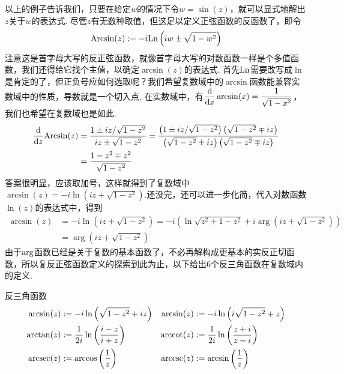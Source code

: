 以上的例子告诉我们，只要在给定\(w\)的情况下令\(w=\sin(z)\)，就可以显式地解出\(z\)关于\(w\)的表达式. 尽管\(z\)有无数种取值，但这足以定义正弦函数的反函数了，即令
\[{\rm Arcsin}(z):=-i{\rm Ln}\left(iw \pm \sqrt{1-w^2}\right)\]
注意这是首字母大写的反正弦函数，就像首字母大写的对数函数一样是个多值函数，我们还得给它找个主值，以确定\(\arcsin(z)\)的表达式. 首先\({\rm Ln}\)需要改写成\(\ln\)是肯定的了，但正负号应如何选取呢？我们希望复数域中的\(\arcsin\)函数能兼容实数域中的性质，导数就是一个切入点. 在实数域中，有\(\displaystyle{\frac{\rm d}{{\rm d}x}\arcsin(x) = \frac{1}{\sqrt{1-x^2}}}\)，我们也希望在复数域也是如此.
\begin{align*}
    \frac{\rm d}{{\rm d}z}{\rm Arcsin}(z) &= \frac{1 \pm iz/\sqrt{1-z^2}}{iz \pm \sqrt{1-z^2}} = \frac{\left(1\pm iz/\sqrt{1-z^2}\right)\left(\sqrt{1-z^2}\mp iz\right)}{\left(\sqrt{1-z^2}\pm iz\right)\left(\sqrt{1-z^2}\mp iz\right)} \\
    &= \frac{1-z^2 \mp z^2}{\sqrt{1-z^2}}
\end{align*}
答案很明显，应该取加号，这样就得到了复数域中\(\displaystyle{\arcsin(z)=-i\ln\left(iz+\sqrt{1-z^2}\right)}\).还没完，还可以进一步化简，代入对数函数\(\ln(z)\)的表达式中，得到
\begin{align*}
    \arcsin(z) & =-i\ln\left(iz+\sqrt{1-z^2}\right) = -i\left(\ln\sqrt{z^2+1-z^2}+i\arg\left(iz+\sqrt{1-z^2}\right)\right) \\
    &= \arg\left(iz+\sqrt{1-z^2}\right)
\end{align*}
由于\({\rm arg}\)函数已经是关于复数的基本函数了，不必再解构成更基本的实反正切函数，所以复反正弦函数定义的探索到此为止，以下给出6个反三角函数在复数域内的定义.
\begin{definition}{反三角函数}
    \[
        \begin{aligned}
            \arcsin(z) &:= -i\ln\left(\sqrt{1-z^2}+iz\right) & \arcsin(z) &:= -i\ln\left(i\sqrt{1-z^2}+z\right) \\
            \arctan(z) &:= \frac{1}{2i}\ln\left(\frac{i-z}{i+z}\right) & {\rm arccot}(z) &:= \frac{1}{2i}\ln\left(\frac{z+i}{z-i}\right) \\
            {\rm arcsec}(z) &:= \arccos\left(\frac{1}{z}\right) & {\rm arccsc}(z) &:= \arcsin\left(\frac{1}{z}\right)
        \end{aligned}
    \]
\end{definition}

